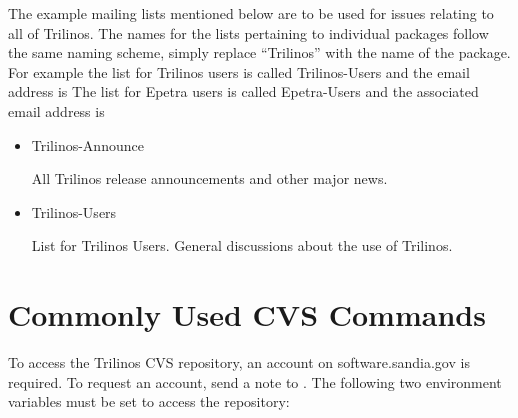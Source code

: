 \documentclass[12pt,relax]{TrilinosUserGuide}
\begin{document}
\begin{minipage}[c]{\textwidth}
\begin{minipage}[l]{.6\textwidth}
The example mailing lists mentioned below are to be used
for issues relating to all of Trilinos.  The names for the lists pertaining to
individual packages follow the same naming scheme, simply replace ``Trilinos''
with the name of the package.  For example the list for Trilinos users is
called Trilinos-Users and the email address is
  The list
for Epetra users is called Epetra-Users and the associated email address is
\end{minipage}\hfill
{}
\end{minipage}


\begin{itemize}
\item Trilinos-Announce

All Trilinos release announcements and other major news.

\item Trilinos-Users

List for Trilinos Users.  General discussions about the use of Trilinos.
\end{itemize}


\clearpage

%


\appendix
\section{Commonly Used CVS Commands}
\label{Section:CVS}
To access the Trilinos CVS repository, an account on software.sandia.gov is
required.  To request an account, send a note to
.
The following two
environment variables must be set to access the repository:
\end{document}
